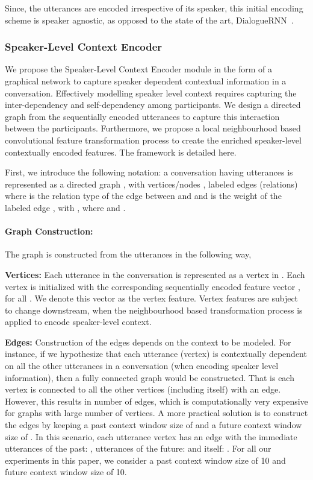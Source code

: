 \documentclass[11pt,a4paper]{article}
\begin{document}
Since, the utterances are encoded irrespective of its speaker, this initial encoding scheme is speaker agnostic, as opposed to the state of the art, DialogueRNN~\cite{dialoguernn}.

\subsubsection{Speaker-Level Context Encoder}
\label{sec:spealer-level}
We propose the Speaker-Level Context Encoder module in the form of a graphical network to capture speaker dependent contextual information in a conversation. Effectively modelling speaker level context requires capturing the inter-dependency and self-dependency among participants.
We design a directed graph from the sequentially encoded utterances to capture this interaction between the participants. Furthermore, we propose a local neighbourhood based convolutional feature transformation process to create the enriched speaker-level contextually encoded features. The framework is detailed here. 

First, we introduce the following notation: a conversation having  utterances is represented as a directed graph , with vertices/nodes , labeled edges (relations) 
 where  is the relation type of the edge between  and  
and  is the weight of the labeled edge , with , where  and . 

\paragraph{\textbf{Graph Construction:}} The graph is constructed from the utterances in the following way,

  \textbf{Vertices:} Each utterance in the conversation is represented as a vertex  in . 
  Each vertex  is initialized with the corresponding sequentially encoded feature vector , for all . 
  We denote this vector as the vertex feature. Vertex features are subject to change downstream, when the neighbourhood based transformation process is applied to encode speaker-level context.


  \textbf{Edges:} Construction of the edges  depends on the context to be modeled. 
  For instance, if we hypothesize that each utterance (vertex) is contextually dependent on all the other utterances in a conversation (when encoding speaker level information), then a fully connected graph would be constructed. That is each vertex is connected to all the other vertices (including itself) with an edge. 
  However, this results in  number of edges, which is computationally very expensive for graphs with large number of vertices. 
  A more practical solution is to construct the edges by keeping a past context window size of  and a future context window size of . 
  In this scenario, each utterance vertex  has an edge with the immediate  utterances of the past: ,  utterances of the future:  and itself: . For all our experiments in this paper, we consider a past context window size of 10 and future context window size of 10.
  
\end{document}
